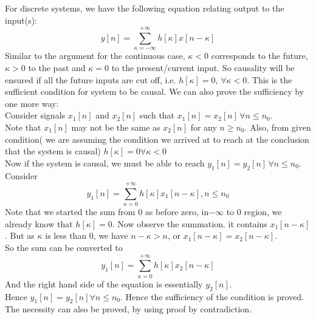 For discrete systems, we have the following equation relating output to the input(s):
\begin{equation}
y[n]=\sum_{\kappa=-\infty}^{+\infty} h[\kappa]x[n-\kappa] \nonumber
\end{equation}
Similar to the argument for the continuous case, $\kappa<0$ corresponds to the future, $\kappa>0$ to the past and $\kappa=0$ to the present/current input. So causality will be ensured if all the future inputs are cut off, i.e. $h[\kappa]=0,\, \forall \kappa<0$. This is the sufficient condition for  system to be causal. We can also prove the sufficiency by one more way:\\
Consider signals $x_{1}[n]$ and $x_{2}[n]$ such that $x_{1}[n]=x_{2}[n]\, \forall n \le n_{0}$.\\ Note that $x_{1}[n]$ may not be the same as $x_{2}[n]$ for any $n \geq n_{0}.$ Also, from given condition( we are assuming the condition we arrived at to reach at the conclusion that the system is causal)  $h[\kappa]=0 \forall \kappa<0$\\
Now if the system is causal, we must be able to reach  $y_{1}[n]=y_{2}[n]\, \forall n \le n_{0}$.\\
Consider
\begin{equation}
y_{1}[n]=\sum_{\kappa=0}^{+\infty} h[\kappa]x_{1}[n-\kappa],  n \le n_{0} \nonumber
\end{equation}
Note that we started the sum from 0 as before zero, in$-\infty$ to 0 region, we already know that  $h[\kappa]=0$.
Now observe the summation. it contains $x_{1}[n-\kappa]$. But as $\kappa$ is less than 0, we have $n-\kappa>n$, or  $x_{1}[n-\kappa]= x_{2}[n-\kappa]$.\\
So the sum can be converted to 
\begin{equation}
y_{1}[n]=\sum_{\kappa=0}^{+\infty} h[\kappa]x_{2}[n-\kappa] \nonumber
\end{equation}
And the right hand side of the equation is essentially $y_{2}[n]$.\\
Hence  $y_{1}[n]=y_{2}[n] \forall n \le n_{0}$. Hence the sufficiency of the condition is proved. The necessity can also be proved, by using proof by contradiction.
